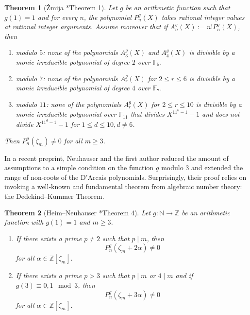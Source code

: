 \documentclass[a4paper, 11pt, reqno]{amsart}
\theoremstyle{plain}
\newtheorem{thm}{Theorem}[section]
\theoremstyle{definition}
\theoremstyle{remark}
\numberwithin{equation}{section}
\newcommand{\Z}{\mathbb{Z}}
\newcommand{\N}{\mathbb{N}}
\newcommand{\F}{\mathbb{F}}
\begin{document}
\begin{thm}[\.{Z}mija \cite{Zmija}*{Theorem 1}]\label{thm:Zmija}
    Let $g$ be an arithmetic function such that $g(1) = 1$ and for every $n$, the polynomial $P_n^g(X)$ takes rational integer values at rational integer arguments. Assume moreover that if $A_n^g(X) := n!P_n^g(X)$, then
    \begin{enumerate}
        \item modulo $5$: none of the polynomials $A_3^g(X)$ and $A_4^g(X)$ is divisible by a monic irreducible polynomial of degree $2$ over $\F_5$.
        \item modulo $7$: none of the polynomials $A_r^g(X)$ for $2 \leq r \leq 6$ is divisible by a monic irreducible polynomial of degree $4$ over $\F_7$.
        \item modulo $11$: none of the polynomials $A_r^g(X)$ for $2 \leq r \leq 10$ is divisible by a monic irreducible polynomial over $\F_{11}$ that divides $X^{11^6 - 1} - 1$ and does not divide $X^{11^d- 1}- 1$ for $1 \leq d \leq 10, d \neq 6$.
    \end{enumerate}
    Then $P_n^g(\zeta_m) \neq 0$ for all $m \geq 3$.
\end{thm}

In a recent preprint, Neuhauser and the first author reduced the amount of assumptions to a simple condition on the function $g$ modulo $3$ and extended the range of non-roots of the D'Arcais polynomials. Surprisingly, their proof relies on invoking a well-known and fundamental theorem from algebraic number theory: the Dedekind--Kummer Theorem.

\begin{thm}[Heim--Neuhauser \cite{HeimNeu25}*{Theorem 4}]\label{thm:NoRootsAtAlgebraicIntegersThatAreCongruentToPrimitiveRootsOfUnity}
    Let $g: \N \longrightarrow \Z$ be an arithmetic function with $g(1) = 1$ and $m \geq 3$.
    \begin{enumerate}
        \item If there exists a prime $p \neq 2$ such that $p \mid m$, then
        \[P_n^g(\zeta_m + 2\alpha) \neq 0\]
        for all $\alpha \in \Z[\zeta_m]$.
        \item If there exists a prime $p > 3$ such that $p \mid m$ or $4 \mid m$ and if $g(3) \equiv 0,1 \mod 3$, then
        \[P_n^g(\zeta_m + 3\alpha) \neq 0\]
        for all $\alpha \in \Z[\zeta_m]$.
    \end{enumerate}
\end{thm}
\end{document}
